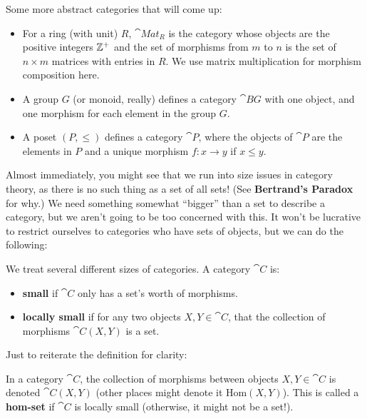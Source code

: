 \begin{example}
  Some more abstract categories that will come up:
  \begin{itemize}
    \item For a ring (with unit) $R$, $\cat{Mat}_R$ is the category whose objects are the positive integers $\mathbb Z^+$ and the set of morphisms from $m$ to $n$ is the set of $n \times m$ matrices with entries in $R$. We use matrix multiplication for morphism composition here.
    \item A group $G$ (or monoid, really) defines a category $\cat BG$ with one object, and one morphism for each element in the group $G$.
    \item A poset $(P, \leq)$ defines a category $\cat P$, where the objects of $\cat P$ are the elements in $P$ and a unique morphism $f : x \to y$ if $x \leq y$.
  \end{itemize}
\end{example}

Almost immediately, you might see that we run into size issues in category theory, as there is no such thing as a set of all sets! (See \textbf{Bertrand's Paradox} for why.) We need something somewhat ``bigger'' than a set to describe a category, but we aren't going to be too concerned with this. It won't be lucrative to restrict ourselves to categories who have sets of objects, but we can do the following:

\begin{definition}[Smallness]
  We treat several different sizes of categories. A category $\cat C$ is:
  \begin{itemize}
    \item \textbf{small} if $\cat C$ only has a set's worth of morphisms.
    \item \textbf{locally small} if for any two objects $X, Y \in \cat C$, that the collection of morphisms $\cat C(X, Y)$ is a set.
  \end{itemize}
\end{definition}
Just to reiterate the definition for clarity:
\begin{definition}
  In a category $\cat C$, the collection of morphisms between objects $X, Y \in \cat C$ is denoted $\cat C(X, Y)$ (other places might denote it $\mathrm{Hom}(X, Y)$). This is called a \textbf{hom-set} if $\cat C$ is locally small (otherwise, it might not be a set!).
\end{definition}

